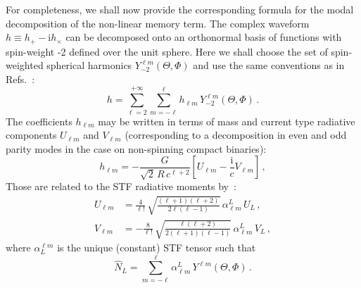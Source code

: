 \documentclass[prd,preprint,superscriptaddress,tightenlines,nofootinbib,
  eqsecnum,showpacs]{revtex4}
\newcommand{\ui}{\mathrm{i}}
\begin{document}
For completeness, we shall now provide the corresponding formula for
the modal decomposition of the non-linear memory term. The complex
waveform $h \equiv h_+ - \ui h_\times$ can be decomposed onto an
orthonormal basis of functions with spin-weight -2 defined over the
unit sphere. Here we shall choose the set of spin-weighted spherical
harmonics $Y^{\ell m}_{-2}(\Theta,\Phi)$ and use the same conventions
as in Refs.~\cite{BFIS08, FMBI12}:
%
\begin{equation}\label{eq:hdecomp}
h = \sum^{+\infty}_{\ell=2}\sum^{\ell}_{m=-\ell} h_{\ell
m} \,Y^{\ell m}_{-2}(\Theta,\Phi)\,.
\end{equation}
%
The coefficients $h_{\ell m}$ may be written in terms of mass and
current type radiative components $U_{\ell m}$ and $V_{\ell m}$
(corresponding to a decomposition in even and odd parity modes in the
case on non-spinning compact binaries):
%
\begin{equation}\label{eq:inv}
h_{\ell m} = -\frac{G}{\sqrt{2}\,R\,c^{\ell+2}}\left[U_{\ell
m}-\frac{\ui}{c}V_{\ell m}\right]\,,
\end{equation}
%
Those are related to the STF radiative moments by~\cite{Th80}:
%
\begin{subequations} \label{eq:UV}
\begin{align}
U_{\ell m} &=
\frac{4}{\ell!}\,\sqrt{\frac{(\ell+1)(\ell+2)}{2\ell(\ell-1)}}
\,\alpha^L_{\ell m}\,U_L\,,\label{eq:U}\\ V_{\ell m} &
=-\frac{8}{\ell!}\,\sqrt{\frac{\ell(\ell+2)}{2(\ell+1)(\ell-1)}}
\,\alpha^L_{\ell m}\,V_L\,,
\end{align}
\end{subequations}
%
where $\alpha_L^{\ell m}$ is the unique (constant) STF tensor such
that
%
\begin{equation} \label{defalphaL}
\hat{N}_L = \sum_{m=-\ell}^{\ell} \alpha^L_{\ell m}\,Y^{\ell
  m}(\Theta,\Phi)\,.
\end{equation}
%
\end{document}
